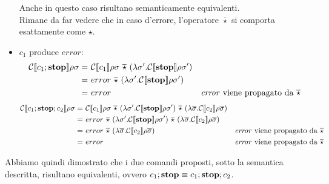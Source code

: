 \begin{itemize}
            Anche in questo caso risultano semanticamente equivalenti.\\
            Rimane da far vedere che in caso d'errore, l'operatore $\overline{\star}$ si comporta esattamente come $\star$.
        \item $c_1$ produce $error$:
            \begin{align*}
                \mathcal{C}\doublebracket{c_1;\mbox{\textbf{stop}}}\rho\sigma =\ & \mathcal{C}\doublebracket{c_1}\rho\sigma\ \overline{\star}\ (\lambda\sigma'.\mathcal{C}\doublebracket{\mbox{\textbf{stop}}}\rho\sigma')\\
                =\ & error\ \overline{\star}\ (\lambda\sigma'.\mathcal{C}\doublebracket{\mbox{\textbf{stop}}}\rho\sigma')\\
                =\ & error &\mbox{\textit{error} viene propagato da $\overline{\star}$}
            \end{align*}
            \begin{align*}
                \mathcal{C}\doublebracket{c_1;\mbox{\textbf{stop}};c_2}\rho\sigma =\ & \mathcal{C}\doublebracket{c_1}\rho\sigma\ \overline{\star}\ (\lambda\sigma'.\mathcal{C}\doublebracket{\mbox{\textbf{stop}}}\rho\sigma')\ \overline{\star}\ (\lambda\overline{\sigma}.\mathcal{C}\doublebracket{c_2}\rho\overline{\sigma})\\
                =\ & error\ \overline{\star}\ (\lambda\sigma'.\mathcal{C}\doublebracket{\mbox{\textbf{stop}}}\rho\sigma')\ \overline{\star}\ (\lambda\overline{\sigma}.\mathcal{C}\doublebracket{c_2}\rho\overline{\sigma})\\
                =\ & error\ \overline{\star}\ (\lambda\overline{\sigma}.\mathcal{C}\doublebracket{c_2}\rho\overline{\sigma}) &\mbox{\textit{error} viene propagato da $\overline{\star}$}\\
                =\ & error\ &\mbox{\textit{error} viene propagato da $\overline{\star}$}
            \end{align*}
    \end{itemize}
    
    Abbiamo quindi dimostrato che i due comandi proposti, sotto la semantica descritta, risultano equivalenti, ovvero $c_1;\mbox{\textbf{stop}} \equiv c_1;\mbox{\textbf{stop}};c_2$.
